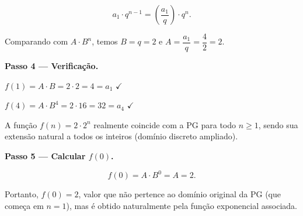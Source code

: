 \documentclass[11pt,a4paper]{article}
\begin{document}
$$a_1\cdot q^{n-1} = \left(\dfrac{a_1}{q}\right)\cdot q^{n}.$$

Comparando com $A\cdot B^n$, temos $B = q = 2$ e $A = \dfrac{a_1}{q} = \dfrac{4}{2} = 2$.

\textbf{Passo 4 — Verificação.}

$f(1) = A\cdot B = 2\cdot 2 = 4 = a_1$ $\checkmark$

$f(4) = A\cdot B^4 = 2\cdot 16 = 32 = a_4$ $\checkmark$

A função $f(n) = 2\cdot 2^n$ realmente coincide com a PG para todo $n\geq 1$, sendo sua extensão natural a todos os inteiros (domínio discreto ampliado).

\textbf{Passo 5 — Calcular $f(0)$.}

$$f(0) = A\cdot B^0 = A = 2.$$

Portanto, $f(0) = 2$, valor que não pertence ao domínio original da PG (que começa em $n=1$), mas é obtido naturalmente pela função exponencial associada.
\end{document}

